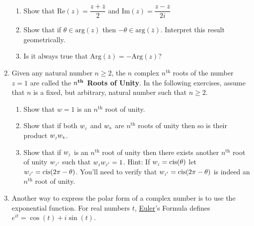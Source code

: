 \begin{enumerate}
\begin{enumerate}
\item Show that $\text{Re}(z) = \dfrac{z + \overline{z}}{2}$ and $\text{Im}(z) = \dfrac{z - \overline{z}}{2i}$

\item Show that if $\theta \in \text{arg}(z)$ then $-\theta \in \text{arg}\left(\overline{z}\right)$. Interpret this result geometrically.

\item Is it always true that $\text{Arg}\left(\overline{z}\right) = -\text{Arg}(z)$?

\end{enumerate}

\item Given any natural number $n \geq 2$, the $n$ complex $n^{\text{th}}$ roots of the number $z = 1$ are called the \textbf{\boldmath $n^{\mbox{\textbf{\scriptsize th}}}$ Roots of Unity}.    In the following exercises, assume that $n$ is a fixed, but arbitrary, natural number such that $n \geq 2$.

\begin{enumerate}

\item Show that $w = 1$ is an $n^{\text{th}}$ root of unity.

\item Show that if both $w_{\text{\tiny$j$}}$ and $w_{\text{\tiny$k$}}$ are $n^{\text{th}}$ roots of unity then so is their product $w_{\text{\tiny$j$}}w_{\text{\tiny$k$}}$.

\item Show that if $w_{\text{\tiny$j$}}$ is an $n^{\text{th}}$ root of unity then there exists another $n^{\text{th}}$ root of unity $w_{\text{\tiny$j'$}}$ such that $w_{\text{\tiny$j$}}w_{\text{\tiny$j'$}} = 1$.  Hint: If $w_{\text{\tiny$j$}} = \text{cis}(\theta)$ let $w_{\text{\tiny$j'$}} = \text{cis}(2\pi - \theta)$. You'll need to verify that $w_{\text{\tiny$j'$}} = \text{cis}(2\pi - \theta)$ is indeed an $n^{\text{th}}$ root of unity.

\end{enumerate}

\item \label{eulerformulaexercise} Another way to express the polar form of a complex number is to use the exponential function.  For real numbers $t$, \href{http://en.wikipedia.org/wiki/Leonhard_Euler}{\underline{Euler}}'s Formula defines $e^{it} = \cos(t) + i \sin(t)$.  


\end{enumerate}
